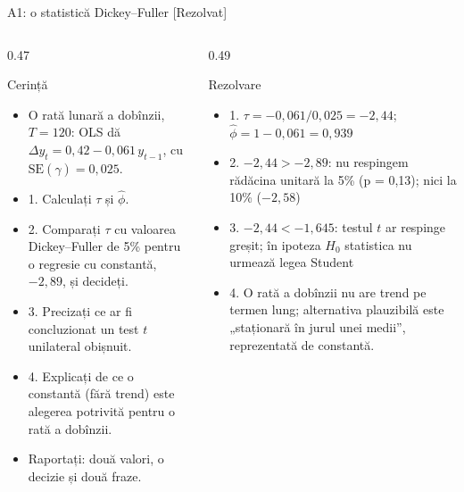 \begin{frame}{A1: o statistică Dickey--Fuller [Rezolvat]}
\itemsize{\scriptsize}
\begin{columns}[T]
\begin{column}{0.47\textwidth}
\begin{block}{Cerință}
\begin{itemize}
    \item O rată lunară a dobînzii, $T = 120$: OLS dă $\Delta y_t = 0{,}42 - 0{,}061\,y_{t-1}$, cu $\mathrm{SE}(\hat\gamma) = 0{,}025$.
    \item 1. Calculați $\tau$ și $\hat\phi$.
    \item 2. Comparați $\tau$ cu valoarea Dickey--Fuller de 5\% pentru o regresie cu constantă, $-2{,}89$, și decideți.
    \item 3. Precizați ce ar fi concluzionat un test $t$ unilateral obișnuit.
    \item 4. Explicați de ce o constantă (fără trend) este alegerea potrivită pentru o rată a dobînzii.
    \item Raportați: două valori, o decizie și două fraze.
\end{itemize}
\end{block}
\end{column}
\begin{column}{0.49\textwidth}
\begin{exampleblock}{Rezolvare}
\begin{itemize}
    \item 1. $\tau = -0{,}061/0{,}025 = -2{,}44$; $\hat\phi = 1 - 0{,}061 = 0{,}939$
    \item 2. $-2{,}44 > -2{,}89$: nu respingem rădăcina unitară la 5\% (p = 0{,}13); nici la 10\% ($-2{,}58$)
    \item 3. $-2{,}44 < -1{,}645$: testul $t$ ar respinge greșit; în ipoteza $H_0$ statistica nu urmează legea Student
    \item 4. O rată a dobînzii nu are trend pe termen lung; alternativa plauzibilă este „staționară în jurul unei medii”, reprezentată de constantă.
\end{itemize}
\end{exampleblock}
\end{column}
\end{columns}
\end{frame}

